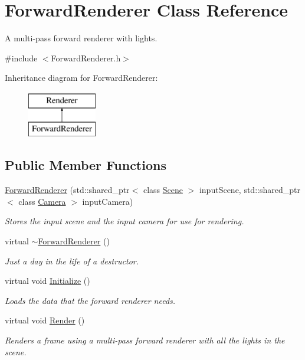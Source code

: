 \hypertarget{class_forward_renderer}{}\section{Forward\+Renderer Class Reference}
\label{class_forward_renderer}


A multi-\/pass forward renderer with lights.  




{\ttfamily \#include $<$Forward\+Renderer.\+h$>$}

Inheritance diagram for Forward\+Renderer\+:\begin{figure}[H]
\begin{center}
\leavevmode
\includegraphics[height=2.000000cm]{class_forward_renderer}
\end{center}
\end{figure}
\subsection*{Public Member Functions}
\begin{DoxyCompactItemize}
\item 
\hyperlink{class_forward_renderer_af8ed84e45085c4dc60d565fcc3c198d1}{Forward\+Renderer} (std\+::shared\+\_\+ptr$<$ class \hyperlink{class_scene}{Scene} $>$ input\+Scene, std\+::shared\+\_\+ptr$<$ class \hyperlink{class_camera}{Camera} $>$ input\+Camera)
\begin{DoxyCompactList}\small\item\em Stores the input scene and the input camera for use for rendering. \end{DoxyCompactList}\item 
virtual \hyperlink{class_forward_renderer_ab27ea6139730631d79488cec3c564597}{$\sim$\+Forward\+Renderer} ()
\begin{DoxyCompactList}\small\item\em Just a day in the life of a destructor. \end{DoxyCompactList}\item 
virtual void \hyperlink{class_forward_renderer_a99c523e11a4335d061da8bdba51f1c9a}{Initialize} ()
\begin{DoxyCompactList}\small\item\em Loads the data that the forward renderer needs. \end{DoxyCompactList}\item 
virtual void \hyperlink{class_forward_renderer_a3693c5cd68afffc14652f24fcdc62abc}{Render} ()
\begin{DoxyCompactList}\small\item\em Renders a frame using a multi-\/pass forward renderer with all the lights in the scene. \end{DoxyCompactList}\end{DoxyCompactItemize}
